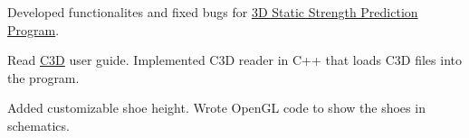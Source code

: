 \UM
{}

Developed functionalites and fixed bugs for \href{https://c4e.engin.umich.edu/tools-services/3dsspp-software/}{3D Static Strength Prediction Program}.

\begin{miniItemize}
    \item Read \href{https://www.c3d.org/}{C3D} user guide. Implemented C3D reader in C++ that loads C3D files into the program.
    \item Added customizable shoe height. Wrote OpenGL code to show the shoes in schematics.
\end{miniItemize}

